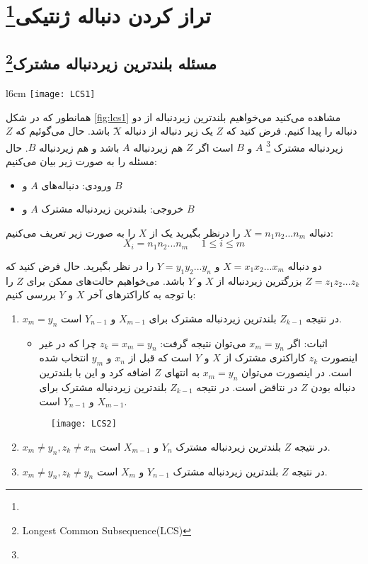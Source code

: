 \pagebreak
\section{تراز کردن دنباله ژنتیکی\protect\footnote{}}

\subsection*{مسئله بلندترین زیردنباله مشترک\protect\footnote{Longest Common Subsequence(LCS)}}

\begin{wrapfigure}{l}{6cm}
\centering
\texttt{[image: LCS1]}
\caption{بلندترین زیردنباله مشترک}
\label{fig:lcs1}
\end{wrapfigure}

همانطور که در شکل
\ref{fig:lcs1}
مشاهده می‌کنید می‌خواهیم بلندترین زیردنباله از دو دنباله را پیدا کنیم. فرض کنید که
$Z$
یک زیر دنباله از دنباله
$ٓX$
باشد. حال می‌گوئیم که
$Z$
زیردنباله مشترک
\footnote{}
$A$
و
$B$
است اگر
$Z$
هم زیردنباله
$A$
باشد و هم زیردنباله
$B$.
حال مسئله را به صورت زیر بیان می‌کنیم:
\begin{itemize}
\item
ورودی: دنباله‌های 
$A$
و
$B$
\item
خروجی: بلندترین زیردنباله مشترک
$A$
و
$B$
\end{itemize}

دنباله
$X = n_{1}n_{2} ... n_{m}$
را درنظر بگیرید یک
از
$X$
را به صورت زیر تعریف می‌کنیم:
\[X_{i}=n_{1}n_{2} ... n_{m}~~~~~~1\leq i \leq m\]

دو دنباله
$X = x_{1}x_{2} ... x_{m}$
و
$Y = y_{1}y_{2} ... y_{n}$
را در نظر بگیرید. حال فرض کنید که
$Z = z_{1}z_{2} ... z_{k}$
بزرگترین زیردنباله از
$X$
و
$Y$
باشد. می‌خواهیم حالت‌های ممکن برای
$Z$
را با توجه به کاراکترهای آخر
$X$
و
$Y$
بررسی کنیم:
\begin{enumerate}
\item
$x_{m} = y_{n} $
در نتیجه
$Z_{k-1}$
بلندترین زیردنباله مشترک برای
$X_{m-1}$
و
$Y_{n-1}$
است.

\begin{itemize}
\item اثبات:
اگر
$x_{m} = y_{n} $
می‌توان نتیجه
گرفت:
$ z_{k} = x_{m} = y_{n}$
چرا که در غیر اینصورت
$z_{k}$
کاراکتری مشترک از
$X$
و
$Y$
است که قبل از
$x_{n}$
و
$y_{m}$
انتخاب شده است. در اینصورت می‌توان
$x_{m} = y_{n} $
به انتهای
$Z$
اضافه کرد و این با بلندترین دنباله بودن
$Z$
در نتاقض است.
در نتیجه
$Z_{k-1}$
بلندترین زیردنباله مشترک برای
$X_{m-1}$
و
$Y_{n-1}$
است.
\end{itemize}

\begin{figure}[htbp]
\centering
\texttt{[image: LCS2]}
\end{figure}

\item
$x_{m} \neq y_{n}, z_{k} \neq x_{m}$
در نتیجه
$Z$
بلندترین زیردنباله مشترک
$Y_{n}$
و
$X_{m-1}$
است.
\item
$x_{m} \neq y_{n}, z_{k} \neq y_{n}$
در نتیجه
$Z$
بلندترین زیردنباله مشترک
$Y_{n-1}$
و
$X_{m}$
است.
\end{enumerate}

